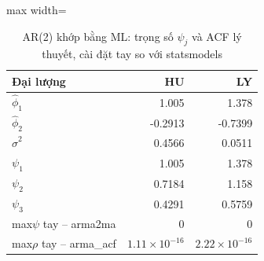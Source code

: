 \begin{table}[H]
\centering\footnotesize
\caption{AR(2) khớp bằng ML: trọng số $\psi_j$ và ACF lý thuyết, cài đặt tay so với statsmodels}\label{tab:tab_b11_05_psi_acf}
\begin{adjustbox}{max width=\linewidth}
\begin{tabular}{|l|r|r|}
\toprule
Đại lượng & HU & LY \\
\midrule
$\hat{\phi}_{1}$ & 1.005 & 1.378 \\
$\hat{\phi}_{2}$ & -0.2913 & -0.7399 \\
$\hat{\sigma}^{2}$ & 0.4566 & 0.0511 \\
$\psi_{1}$ & 1.005 & 1.378 \\
$\psi_{2}$ & 0.7184 & 1.158 \\
$\psi_{3}$ & 0.4291 & 0.5759 \\
max\textbar{}$\psi$ tay – arma2ma\textbar{} & 0 & 0 \\
max\textbar{}$\rho$ tay – arma\_acf\textbar{} & $1.11\times10^{-16}$ & $2.22\times10^{-16}$ \\
\bottomrule
\end{tabular}
\end{adjustbox}
\end{table}
